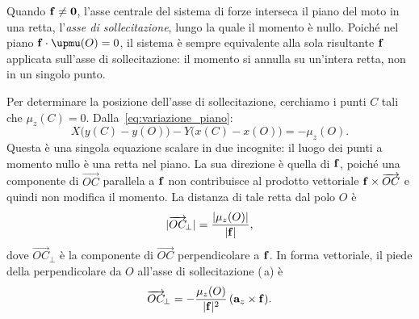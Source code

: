 Quando $\mathbf{f} \neq \mathbf{0}$, l'asse centrale del sistema di
forze interseca il piano del moto in una retta, l'\textit{asse
	di sollecitazione}, lungo la quale il momento è nullo. Poiché
nel piano $\fb \cdot \bm{\upmu}(O) = 0$, il sistema è sempre
equivalente alla sola risultante $\mathbf{f}$ applicata sull'asse di
sollecitazione: il momento si annulla su un'intera retta, non
in un singolo punto.

Per determinare la posizione dell'asse di sollecitazione,
cerchiamo i punti $C$ tali che $\mu_z(C) = 0$.
Dalla~\eqref{eq:variazione_piano}:
\begin{equation}\label{eq:cond_CdR}
	X\bigl(y(C)-y(O)\bigr)
	- Y\bigl(x(C)-x(O)\bigr)
	= -\mu_z(O).
\end{equation}
Questa è una singola equazione scalare in due incognite: il
luogo dei punti a momento nullo è una retta nel piano. La
sua direzione è quella di $\mathbf{f}$, poiché una componente di
$\overrightarrow{OC}$ parallela a $\mathbf{f}$ non contribuisce al
prodotto vettoriale $\mathbf{f} \times \overrightarrow{OC}$ e quindi
non modifica il momento. La distanza di tale retta dal polo
$O$ è
\begin{equation}\label{eq:CdR_distanza}
	|\overrightarrow{OC}_{\!\perp}|
	= \frac{|\mu_z(O)|}{|\mathbf{f}|},
\end{equation}
dove $\overrightarrow{OC}_{\!\perp}$ è la componente di
$\overrightarrow{OC}$ perpendicolare a $\mathbf{f}$. In forma
vettoriale, il piede della perpendicolare da $O$ all'asse di
sollecitazione  (\,a) è
\begin{equation}\label{eq:vettore_OC_F}
	\overrightarrow{OC}_{\!\perp}
	= -\frac{\mu_z(O)}{|\mathbf{f}|^2}\,
	(\mathbf{a}_z \times \mathbf{f}).
\end{equation}

